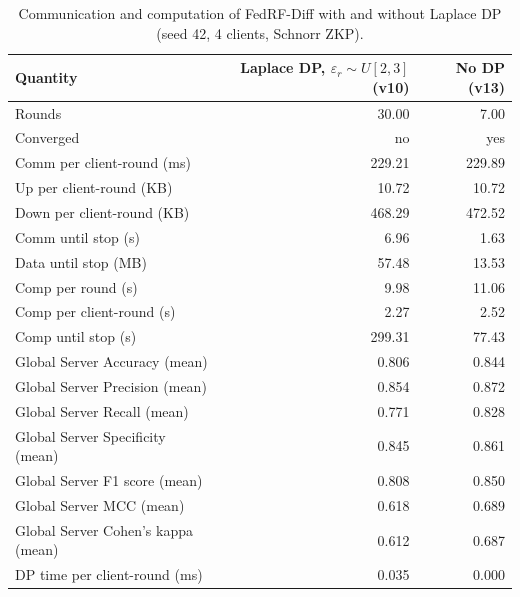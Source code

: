 \begin{table}[t]
\centering
\caption{Communication and computation of FedRF-Diff with and without Laplace DP (seed 42, 4 clients, Schnorr ZKP).}
\label{tab:dp_comparison}
\begin{tabular}{lrr}
\toprule
Quantity & Laplace DP, $\varepsilon_r\sim U[2,3]$ (v10) & No DP (v13) \\
\midrule
Rounds & 30.00 & 7.00 \\
Converged & no & yes \\
Comm per client-round (ms) & 229.21 & 229.89 \\
Up per client-round (KB) & 10.72 & 10.72 \\
Down per client-round (KB) & 468.29 & 472.52 \\
Comm until stop (s) & 6.96 & 1.63 \\
Data until stop (MB) & 57.48 & 13.53 \\
Comp per round (s) & 9.98 & 11.06 \\
Comp per client-round (s) & 2.27 & 2.52 \\
Comp until stop (s) & 299.31 & 77.43 \\
Global Server Accuracy (mean) & 0.806 & 0.844 \\
Global Server Precision (mean) & 0.854 & 0.872 \\
Global Server Recall (mean) & 0.771 & 0.828 \\
Global Server Specificity (mean) & 0.845 & 0.861 \\
Global Server F1 score (mean) & 0.808 & 0.850 \\
Global Server MCC (mean) & 0.618 & 0.689 \\
Global Server Cohen's kappa (mean) & 0.612 & 0.687 \\
DP time per client-round (ms) & 0.035 & 0.000 \\
\bottomrule
\end{tabular}
\end{table}
